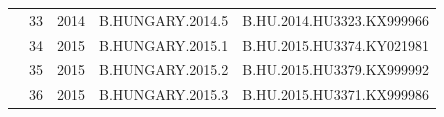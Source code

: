 \begin{table}[htbp]
\begin{tabular}{|cllll|}
\multicolumn{1}{|c|}{}                                   & \multicolumn{1}{l|}{33}          & \multicolumn{1}{l|}{2014}          & \multicolumn{1}{l|}{B.HUNGARY.2014.5}   & B.HU.2014.HU3323.KX999966       \\ \cline{2-5} 
\multicolumn{1}{|c|}{}                                   & \multicolumn{1}{l|}{34}          & \multicolumn{1}{l|}{2015}          & \multicolumn{1}{l|}{B.HUNGARY.2015.1}   & B.HU.2015.HU3374.KY021981       \\ \cline{2-5} 
\multicolumn{1}{|c|}{}                                   & \multicolumn{1}{l|}{35}          & \multicolumn{1}{l|}{2015}          & \multicolumn{1}{l|}{B.HUNGARY.2015.2}   & B.HU.2015.HU3379.KX999992       \\ \cline{2-5} 
\multicolumn{1}{|c|}{}                                   & \multicolumn{1}{l|}{36}          & \multicolumn{1}{l|}{2015}          & \multicolumn{1}{l|}{B.HUNGARY.2015.3}   & B.HU.2015.HU3371.KX999986       \\ \hline
\end{tabular}
\end{table}


